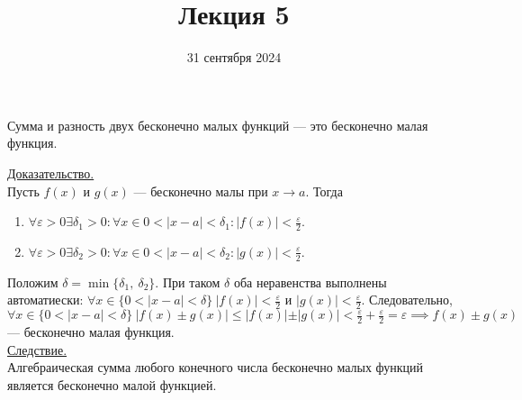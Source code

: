 \documentclass{article}
\title{Лекция 5}
\author{}
\date{31 сентября 2024}
\begin{document}
\maketitle

\begin{theorem}
    Сумма и разность двух бесконечно малых функций --- это бесконечно малая функция.
\end{theorem}
\noindent
\underline{Доказательство.}\\
Пусть \(f(x)\) и \(g(x)\) --- бесконечно малы при \(x \to a\). Тогда
\begin{enumerate}
    \item \(\displaystyle \forall \varepsilon > 0 \exists \delta_{1} > 0 : \forall x \in 0 < \vert x - a \vert < \delta_{1}: \vert f(x) \vert < \frac{\varepsilon}{2}\). 
    \item \(\displaystyle \forall \varepsilon > 0 \exists \delta_{2} > 0 : \forall x \in 0 < \vert x - a \vert < \delta_{2}: \vert g(x) \vert < \frac{\varepsilon}{2}\). 
\end{enumerate}
\noindent
Положим \(\delta = \min\{\delta_{1},\ \delta_{2}\}\). При таком \(\delta \) оба неравенства выполнены автоматиески: \(\displaystyle \forall x \in \{0 < \vert x - a \vert < \delta\}\ \vert f(x) \vert < \frac{\varepsilon}{2}\) и \(\displaystyle \vert g(x) \vert < \frac{\varepsilon}{2}\). 
Следовательно, \(\displaystyle \forall x \in \{0 < \vert x - a \vert < \delta\}\ \vert f(x) \pm g(x) \vert \leq \vert f(x) \vert \pm \vert g(x) \vert < \frac{\varepsilon}{2} + \frac{\varepsilon}{2} = \varepsilon \implies f(x) \pm g(x)\) --- бесконечно малая функция.\\
\underline{Следствие.}\\
Алгебраическая сумма любого конечного числа бесконечно малых функций является бесконечно малой функцией.
\end{document}
